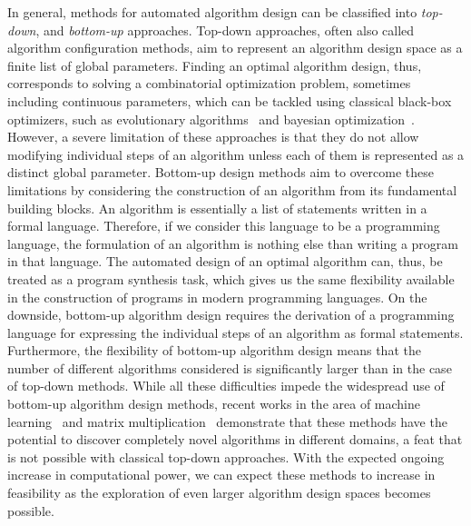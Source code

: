 In general, methods for automated algorithm design can be classified into \emph{top-down}, and \emph{bottom-up} approaches.
Top-down approaches, often also called algorithm configuration methods, aim to represent an algorithm design space as a finite list of global parameters.
Finding an optimal algorithm design, thus, corresponds to solving a combinatorial optimization problem, sometimes including continuous parameters, which can be tackled using classical black-box optimizers, such as evolutionary algorithms~\cite{back1996evolutionary} and bayesian optimization~\cite{frazier2018tutorial}.
However, a severe limitation of these approaches is that they do not allow modifying individual steps of an algorithm unless each of them is represented as a distinct global parameter.
Bottom-up design methods aim to overcome these limitations by considering the construction of an algorithm from its fundamental building blocks.
An algorithm is essentially a list of statements written in a formal language.
Therefore, if we consider this language to be a programming language, the formulation of an algorithm is nothing else than writing a program in that language.
The automated design of an optimal algorithm can, thus, be treated as a program synthesis task, which gives us the same flexibility available in the construction of programs in modern programming languages.
On the downside, bottom-up algorithm design requires the derivation of a programming language for expressing the individual steps of an algorithm as formal statements.
Furthermore, the flexibility of bottom-up algorithm design means that the number of different algorithms considered is significantly larger than in the case of top-down methods.
While all these difficulties impede the widespread use of bottom-up algorithm design methods, recent works in the area of machine learning~\cite{real2020automl,co2021evolving} and matrix multiplication~\cite{fawzi2022discovering} demonstrate that these methods have the potential to discover completely novel algorithms in different domains, a feat that is not possible with classical top-down approaches.
With the expected ongoing increase in computational power, we can expect these methods to increase in feasibility as the exploration of even larger algorithm design spaces becomes possible.

